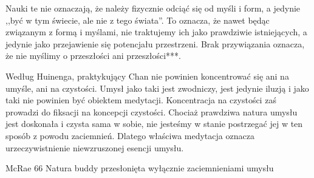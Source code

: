Nauki te nie oznaczają, że należy fizycznie odciąć się od myśli i form, a jedynie ,,być w tym świecie, ale nie z tego świata''. To oznacza, że nawet będąc związanym z formą i myślami, nie traktujemy ich jako prawdziwie istniejących, a jedynie jako przejawienie się potencjału przestrzeni. Brak przywiązania oznacza, że nie myślimy o przeszłości ani przeszłości***.

Według Huinenga, praktykujący Chan nie powinien koncentrować się ani na umyśle, ani na czystości. Umysł jako taki jest zwodniczy, jest jedynie iluzją i jako taki nie powinien być obiektem medytacji. Koncentracja na czystości zaś prowadzi do fiksacji na koncepcji czystości. Chociaż prawdziwa natura umysłu jest doskonała i czysta sama w sobie, nie jesteśmy w stanie postrzegać jej w ten sposób z powodu zaciemnień. Dlatego właściwa medytacja oznacza urzeczywistnienie niewzruszonej esencji umysłu.

McRae 66
Natura buddy przesłonięta wyłącznie zaciemnieniami umysłu
\fi
